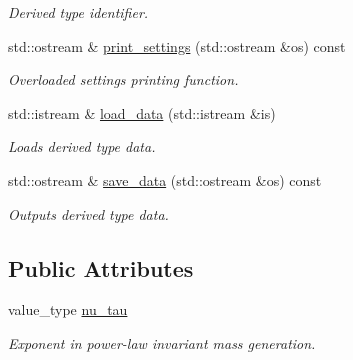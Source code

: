 \begin{DoxyCompactItemize}
\begin{DoxyCompactList}\small\item\em Derived type identifier. \end{DoxyCompactList}\item 
\hypertarget{a00255_a9c2dbca84f1612729128d0727899ef46}{std\-::ostream \& \hyperlink{a00255_a9c2dbca84f1612729128d0727899ef46}{print\-\_\-settings} (std\-::ostream \&os) const }\label{a00255_a9c2dbca84f1612729128d0727899ef46}

\begin{DoxyCompactList}\small\item\em Overloaded settings printing function. \end{DoxyCompactList}\item 
\hypertarget{a00255_a3b8204665c37ce503a2ce76a054213cb}{std\-::istream \& \hyperlink{a00255_a3b8204665c37ce503a2ce76a054213cb}{load\-\_\-data} (std\-::istream \&is)}\label{a00255_a3b8204665c37ce503a2ce76a054213cb}

\begin{DoxyCompactList}\small\item\em Loads derived type data. \end{DoxyCompactList}\item 
\hypertarget{a00255_aa746f25dbce88d44b13a9029fddb66c0}{std\-::ostream \& \hyperlink{a00255_aa746f25dbce88d44b13a9029fddb66c0}{save\-\_\-data} (std\-::ostream \&os) const }\label{a00255_aa746f25dbce88d44b13a9029fddb66c0}

\begin{DoxyCompactList}\small\item\em Outputs derived type data. \end{DoxyCompactList}\end{DoxyCompactItemize}
\subsection*{Public Attributes}
\begin{DoxyCompactItemize}
\item 
\hypertarget{a00255_a1aa104775ec464a6cc8feec1be785142}{value\-\_\-type \hyperlink{a00255_a1aa104775ec464a6cc8feec1be785142}{nu\-\_\-tau}}\label{a00255_a1aa104775ec464a6cc8feec1be785142}

\begin{DoxyCompactList}\small\item\em Exponent in power-\/law invariant mass generation. \end{DoxyCompactList}\end{DoxyCompactItemize}
